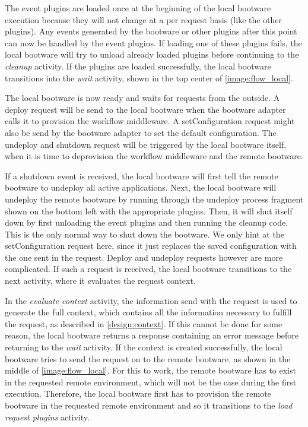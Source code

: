 The event plugins are loaded once at the beginning of the local bootware execution because they will not change at a per request basis (like the other plugins).
Any events generated by the bootware or other plugins after this point can now be handled by the event plugins.
If loading one of these plugins fails, the local bootware will try to unload already loaded plugins before continuing to the \textit{cleanup} activity.
If the plugins are loaded successfully, the local bootware transitions into the \textit{wait} activity, shown in the top center of \autoref{image:flow_local}.

The local bootware is now ready and waits for requests from the outside.
A deploy request will be send to the local bootware when the bootware adapter calls it to provision the workflow middleware.
A setConfiguration request might also be send by the bootware adapter to set the default configuration.
The undeploy and shutdown request will be triggered by the local bootware itself, when it is time to deprovision the workflow middleware and the remote bootware.

If a shutdown event is received, the local bootware will first tell the remote bootware to undeploy all active applications.
Next, the local bootware will undeploy the remote bootware by running through the undeploy process fragment shown on the bottom left with the appropriate plugins.
Then, it will shut itself down by first unloading the event plugins and then running the cleanup code.
This is the only normal way to shut down the bootware.
We only hint at the setConfiguration request here, since it just replaces the saved configuration with the one sent in the request.
Deploy and undeploy requests however are more complicated.
If such a request is received, the local bootware transitions to the next activity, where it evaluates the request context.

In the \textit{evaluate context} activity, the information send with the request is used to generate the full context, which contains all the information necessary to fulfill the request, as described in \autoref{design:context}.
If this cannot be done for some reason, the local bootware returns a response containing an error message before returning to the \textit{wait} activity.
If the context is created successfully, the local bootware tries to send the request on to the remote bootware, as shown in the middle of \autoref{image:flow_local}.
For this to work, the remote bootware has to exist in the requested remote environment, which will not be the case during the first execution.
Therefore, the local bootware first has to provision the remote bootware in the requested remote environment and so it transitions to the \textit{load request plugins} activity.

